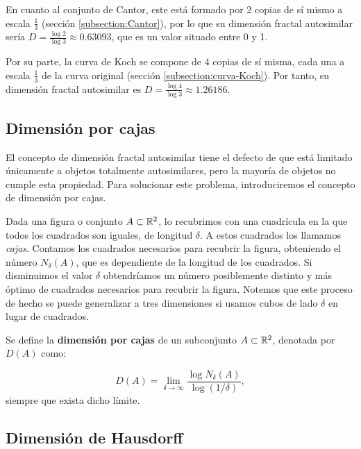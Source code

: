 En cuanto al conjunto de Cantor, este está formado por 2 copias de sí mismo a escala $\frac 1 3$ (sección \ref{subsection:Cantor}), por lo que su dimensión fractal autosimilar sería $D=\frac{\log 2}{\log 3} \approx 0.63093$, que es un valor situado entre 0 y 1.

Por su parte, la curva de Koch se compone de 4 copias de sí misma, cada una a escala $\frac 1 3$ de la curva original (sección \ref{subsection:curva-Koch}). Por tanto, su dimensión fractal autosimilar es $D=\frac{\log 4}{\log 3} \approx 1.26186$.

\subsection{Dimensión por cajas}
\label{subsection:dim-cajas}

El concepto de dimensión fractal autosimilar tiene el defecto de que está limitado únicamente a objetos totalmente autosimilares, pero la mayoría de objetos no cumple esta propiedad. Para solucionar este problema, introduciremos el concepto de dimensión por cajas.

Dada una figura o conjunto $A\subset \mathbb{R}^2$, lo recubrimos con una cuadrícula en la que todos los cuadrados son iguales, de longitud $\delta$. A estos cuadrados los llamamos \textit{cajas}. Contamos los cuadrados necesarios para recubrir la figura, obteniendo el número $N_\delta(A)$, que es dependiente de la longitud de los cuadrados. Si disminuimos el valor $\delta$ obtendríamos un número posiblemente distinto y más óptimo de cuadrados necesarios para recubrir la figura. Notemos que este proceso de hecho se puede generalizar a tres dimensiones si usamos cubos de lado $\delta$ en lugar de cuadrados.

\begin{definicion}
Se define la \textbf{dimensión por cajas} de un subconjunto $A\subset \mathbb{R}^2$, denotada por $D(A)$ como:

\begin{equation}\label{eq:dim-cajas}
D(A)=\lim_{\delta\rightarrow\infty}\frac{\log N_\delta(A)}{\log(1/\delta)},
\end{equation}
siempre que exista dicho límite.
\end{definicion}

\subsection{Dimensión de Hausdorff}
\label{subsection:dim-Hausdorff}

